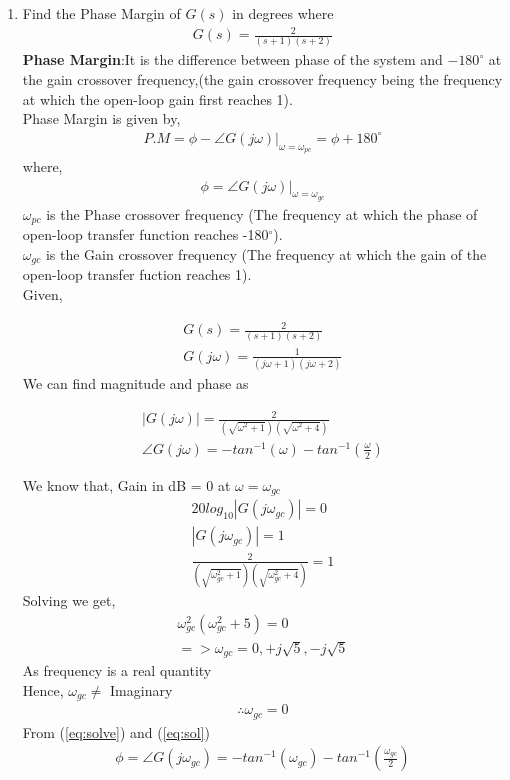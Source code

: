 \begin{enumerate}[label=\thesection.\arabic*.,ref=\thesection.\theenumi]

\item
Find the Phase Margin of $G(s)$ in degrees where
\begin{align}
G(s) = \frac{2}{(s+1)(s+2)}
\end{align}
\solution \textbf{Phase Margin}:It is the difference between phase of the system and $-180^{\circ}$ at the gain crossover frequency,(the gain crossover frequency being the frequency at which the open-loop gain first reaches 1).\\
Phase Margin is given by,
\begin{align}
P.M=\phi-\angle G(j\omega)|_{\omega=\omega_{pc}}=\phi+180^{\circ}
\end{align}
where,
\begin{align}
\phi=\angle G(j\omega)|_{\omega=\omega_{gc}}
\label{eq:sol}
\end{align}
$\omega_{pc}$ is the Phase crossover frequency (The frequency at which the phase of open-loop transfer function reaches -180$^{\circ}$).\\
$\omega_{gc}$ is the Gain crossover frequency (The frequency at which the gain of the open-loop transfer fuction reaches 1).\\
Given,

\begin{align}
G(s) = \frac{2}{(s+1)(s+2)} 
\\
G(j\omega)=\frac{1}{(j\omega+1)(j\omega+2)} 
\end{align}
We can find magnitude and phase as

\begin{align}
|G(j\omega)|=\frac{2}{(\sqrt{\omega^2+1})(\sqrt{\omega^2+4})}
\\
\angle G(j\omega)=- tan^{-1}(\omega) - tan^{-1}(\frac{\omega}{2}) \label{eq:solve}
\end{align}

We know that,
Gain in dB = 0 at $\omega=\omega_{gc}$
\begin{align}
20log_{10}|G(j\omega_{gc})|=0 
\\
|G(j\omega_{gc})|=1
\\
\frac{2}{(\sqrt{\omega_{gc}^2+1})(\sqrt{\omega_{gc}^2+4})}=1
\end{align}
Solving we get,
\begin{align}
\omega^2_{gc}(\omega^2_{gc}+5)=0
\\
=> \omega_{gc}=0,+j\sqrt{5},-j\sqrt{5}
\end{align}
As frequency is a real quantity
\\Hence, $\omega_{gc} \neq$ Imaginary
\begin{align}
\therefore  \omega_{gc} =0
\end{align}
From (\ref{eq:solve}) and (\ref{eq:sol})
\begin{align}
\phi= \angle G(j\omega_{gc})= -tan^{-1}(\omega_{gc})-tan^{-1}(\frac{\omega_{gc}}{2})
\end{align}


\end{enumerate}
